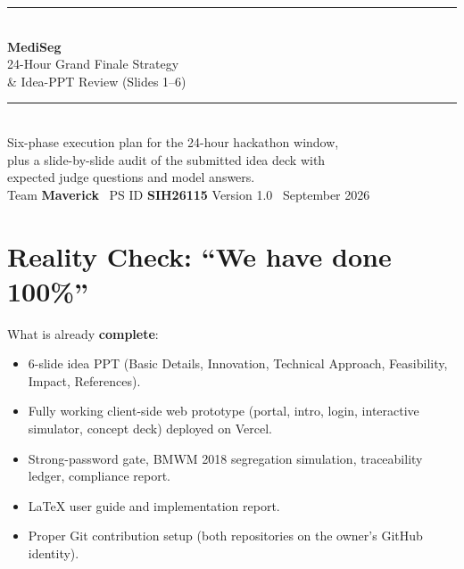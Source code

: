\documentclass[11pt, a4paper]{article}
\begin{document}
\begin{titlepage}
\centering
\vspace*{2.4cm}
{\color{teal!50!white}\rule{\textwidth}{1pt}}\\[0.8em]
{\Huge\bfseries\textcolor{mediseg}{MediSeg}}\\[0.5em]
{\LARGE 24-Hour Grand Finale Strategy}\\[1.2em]
{\Large \& Idea-PPT Review (Slides 1--6)}\\[0.4em]
{\color{teal!50!white}\rule{\textwidth}{1pt}}\\[3em]
{\large Six-phase execution plan for the 24-hour hackathon window,\\[0.3em]
plus a slide-by-slide audit of the submitted idea deck with\\[0.3em]
expected judge questions and model answers.}\\[3.5em]

{\small Team \textbf{Maverick} \textperiodcentered\ PS ID \textbf{SIH26115}}
\vfill
{\small Version 1.0 \textperiodcentered\ September 2026}
\end{titlepage}

\tableofcontents
\clearpage

\section{Reality Check: ``We have done 100\%''}

What is already \textbf{complete}:
\begin{itemize}[leftmargin=1.6em, itemsep=2pt]
  \item 6-slide idea PPT (Basic Details, Innovation, Technical Approach,
        Feasibility, Impact, References).
  \item Fully working client-side web prototype (portal, intro, login,
        interactive simulator, concept deck) deployed on Vercel.
  \item Strong-password gate, BMWM 2018 segregation simulation, traceability
        ledger, compliance report.
  \item LaTeX user guide and implementation report.
  \item Proper Git contribution setup (both repositories on the owner's GitHub
        identity).
\end{itemize}
\end{document}
